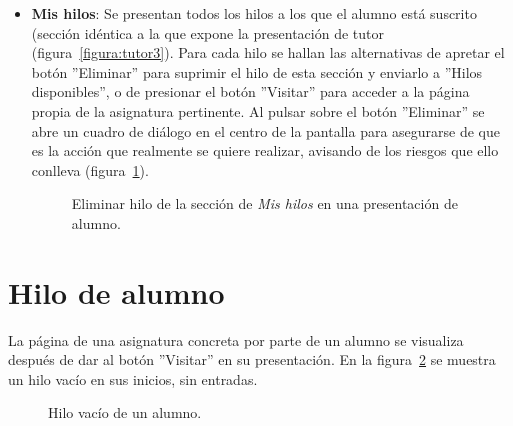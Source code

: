\documentclass[a4paper, 12pt]{book}
\begin{document}
\begin{itemize}
  \item {\bfseries Mis hilos}: Se presentan todos los hilos a los que el alumno est\'a suscrito (secci\'on id\'entica a la que expone la presentaci\'on de 
  tutor (figura~\ref{figura:tutor3}). Para cada hilo se hallan las alternativas de apretar el bot\'on ''Eliminar'' para suprimir el hilo de esta secci\'on y 
  enviarlo a ''Hilos disponibles'', o de presionar el bot\'on ''Visitar'' para acceder a la p\'agina propia de la asignatura pertinente. Al pulsar sobre el 
  bot\'on ''Eliminar'' se abre un cuadro de di\'alogo en el centro de la pantalla para asegurarse de que es la acci\'on que realmente se quiere realizar, 
  avisando de los riesgos que ello conlleva (figura~\ref{figura:alumno3}).
  \begin{figure}[htbp] 
    \centering
    \caption{Eliminar hilo de la secci\'on de \textit{Mis hilos} en una presentaci\'on de alumno.}
    \label{figura:alumno3}
  \end{figure}
\end{itemize} 


\section{Hilo de alumno}
\label{app:hiloalumno}
La p\'agina de una asignatura concreta por parte de un alumno se visualiza despu\'es de dar al bot\'on ''Visitar'' en su presentaci\'on. En la 
figura~\ref{figura:hiloalumno} se muestra un hilo vac\'io en sus inicios, sin entradas.
\begin{figure}[htbp] 
  \centering
  \caption{Hilo vac\'io de un alumno.}
  \label{figura:hiloalumno}
\end{figure}
\end{document}

